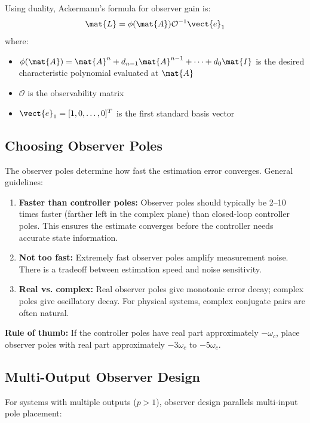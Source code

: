 Using duality, Ackermann's formula for observer gain is:
\begin{equation}
\mat{L} = \phi(\mat{A})\mathcal{O}^{-1}\vect{e}_1
\label{eq:ackermann_observer}
\end{equation}
where:
\begin{itemize}
    \item $\phi(\mat{A}) = \mat{A}^n + d_{n-1}\mat{A}^{n-1} + \cdots + d_0\mat{I}$ is the desired characteristic polynomial evaluated at $\mat{A}$
    \item $\mathcal{O}$ is the observability matrix
    \item $\vect{e}_1 = [1, 0, \ldots, 0]^T$ is the first standard basis vector
\end{itemize}

\subsection{Choosing Observer Poles}

The observer poles determine how fast the estimation error converges. General guidelines:

\begin{enumerate}
    \item \textbf{Faster than controller poles:} Observer poles should typically be 2--10 times faster (farther left in the complex plane) than closed-loop controller poles. This ensures the estimate converges before the controller needs accurate state information.

    \item \textbf{Not too fast:} Extremely fast observer poles amplify measurement noise. There is a tradeoff between estimation speed and noise sensitivity.

    \item \textbf{Real vs. complex:} Real observer poles give monotonic error decay; complex poles give oscillatory decay. For physical systems, complex conjugate pairs are often natural.
\end{enumerate}

\textbf{Rule of thumb:} If the controller poles have real part approximately $-\omega_c$, place observer poles with real part approximately $-3\omega_c$ to $-5\omega_c$.

\subsection{Multi-Output Observer Design}

For systems with multiple outputs ($p > 1$), observer design parallels multi-input pole placement:

